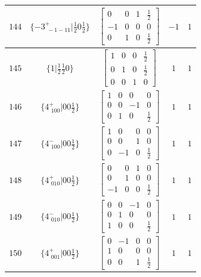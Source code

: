 \documentclass[fleqn,8pt]{jsarticle}
\begin{document}
\begin{longtable}{ccccc}
$ 144 $ & $ \{-3^{+}_{\,\,-1-11}|\frac{1}{2} 0 \frac{1}{2}\} $ & $ \begin{bmatrix} 0 & 0 & 1 & \frac{1}{2} \\ -1 & 0 & 0 & 0 \\ 0 & 1 & 0 & \frac{1}{2} \end{bmatrix} $ & $ -1 $ & $ 1 $ \\ \hline
$ 145 $ & $ \{1|\frac{1}{2} \frac{1}{2} 0\} $ & $ \begin{bmatrix} 1 & 0 & 0 & \frac{1}{2} \\ 0 & 1 & 0 & \frac{1}{2} \\ 0 & 0 & 1 & 0 \end{bmatrix} $ & $ 1 $ & $ 1 $ \\ \hline
$ 146 $ & $ \{4^{+}_{\,\,100}|0 0 \frac{1}{2}\} $ & $ \begin{bmatrix} 1 & 0 & 0 & 0 \\ 0 & 0 & -1 & 0 \\ 0 & 1 & 0 & \frac{1}{2} \end{bmatrix} $ & $ 1 $ & $ 1 $ \\ \hline
$ 147 $ & $ \{4^{-}_{\,\,100}|0 0 \frac{1}{2}\} $ & $ \begin{bmatrix} 1 & 0 & 0 & 0 \\ 0 & 0 & 1 & 0 \\ 0 & -1 & 0 & \frac{1}{2} \end{bmatrix} $ & $ 1 $ & $ 1 $ \\ \hline
$ 148 $ & $ \{4^{+}_{\,\,010}|0 0 \frac{1}{2}\} $ & $ \begin{bmatrix} 0 & 0 & 1 & 0 \\ 0 & 1 & 0 & 0 \\ -1 & 0 & 0 & \frac{1}{2} \end{bmatrix} $ & $ 1 $ & $ 1 $ \\ \hline
$ 149 $ & $ \{4^{-}_{\,\,010}|0 0 \frac{1}{2}\} $ & $ \begin{bmatrix} 0 & 0 & -1 & 0 \\ 0 & 1 & 0 & 0 \\ 1 & 0 & 0 & \frac{1}{2} \end{bmatrix} $ & $ 1 $ & $ 1 $ \\ \hline
$ 150 $ & $ \{4^{+}_{\,\,001}|0 0 \frac{1}{2}\} $ & $ \begin{bmatrix} 0 & -1 & 0 & 0 \\ 1 & 0 & 0 & 0 \\ 0 & 0 & 1 & \frac{1}{2} \end{bmatrix} $ & $ 1 $ & $ 1 $ \\ \hline

\end{longtable}
\end{document}
